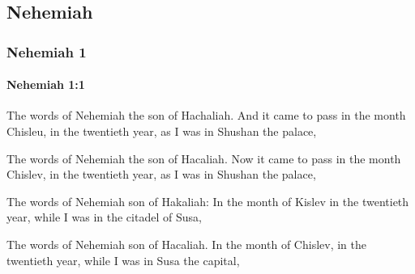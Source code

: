 \subsection{Nehemiah}
	\label{NEHEMIAH}

	\subsubsection{Nehemiah 1} %
		\label{NEHEMIAH-1}

		\paragraph{Nehemiah 1:1} %
			\label{NEHEMIAH-1-1}

			The words of Nehemiah the son of Hachaliah. And it came to pass in the month Chisleu, in the twentieth year, as I was in Shushan the palace,

			\begin{versebox}
					\item[BHS] 
					\item[LXX] 
					\item[ASV] The words of Nehemiah the son of Hacaliah. Now it came to pass in the month Chislev, in the twentieth year, as I was in Shushan the palace,
					\item[NIV] The words of Nehemiah son of Hakaliah: In the month of Kislev in the twentieth year, while I was in the citadel of Susa,
					\item[NRSV] The words of Nehemiah son of Hacaliah. In the month of Chislev, in the twentieth year, while I was in Susa the capital,
			\end{versebox}


